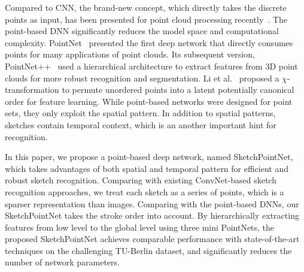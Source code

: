 Compared to CNN, the brand-new concept, which directly takes the discrete points as input, has been presented for point cloud processing recently~\cite{qi2017pointnet, qi2017pointnetplusplus, 1801.07791}.
The point-based DNN significantly reduces the model space and computational complexity.
%
PointNet~\cite{qi2017pointnet} presented the first deep network that directly consumes points for many applications of point clouds.
Its subsequent version, PointNet++~\cite{qi2017pointnetplusplus} used a hierarchical architecture to extract features from 3D point clouds for more robust recognition and segmentation.
%
Li et al.~\cite{1801.07791} proposed a $\chi$-transformation to permute unordered points into a latent potentially canonical order for feature learning.
While point-based networks were designed for point sets, they only exploit the spatial pattern.
In addition to spatial patterns, sketches contain temporal context, which is an another important hint for recognition.



In this paper, we propose a point-based deep network, named SketchPointNet, which takes advantages of both spatial and temporal pattern for efficient and robust sketch recognition.
%
Comparing with existing ConvNet-based sketch recognition approaches, we treat each sketch as a series of points, which is a sparser representation than images.
Comparing with the point-based DNNs, our SketchPointNet takes the stroke order into account.
%
By hierarchically extracting features from low level to the global level using three mini PointNets, the proposed SketchPointNet achieves comparable performance with state-of-the-art techniques on the challenging TU-Berlin dataset, and significantly reduces the number of network parameters.

